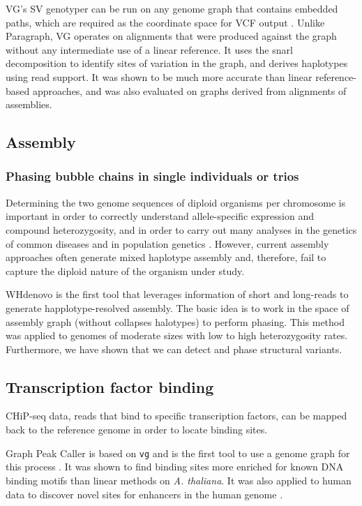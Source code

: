 VG's SV genotyper can be run on any genome graph that contains embedded paths, which are required as the coordinate space for VCF output \cite{hickey2019genotyping}.
Unlike Paragraph, VG operates on alignments that were produced against the graph without any intermediate use of a linear reference.
It uses the snarl decomposition \cite{paten2018superbubbles} to identify sites of variation in the graph, and derives haplotypes using read support.
It was shown to be much more accurate than linear reference-based approaches, and was also evaluated on graphs derived from alignments of assemblies.

\subsection{Assembly}

\subsubsection{Phasing bubble chains in single individuals or trios}

Determining the two genome sequences of diploid organisms per chromosome is important in order to correctly understand allele-specific expression and compound heterozygosity, and in order to carry out many analyses in the genetics of common diseases and in population genetics \cite{tewhey2011importance}. 
However, current assembly approaches often generate mixed haplotype assembly and, therefore, fail to capture the diploid nature of the organism under study. 

WHdenovo \cite{garg2019trio, garg2018graph} is the first tool that leverages information of short and long-reads to generate happlotype-resolved assembly. 
The basic idea is to work in the space of assembly graph (without collapses halotypes) to perform phasing. 
This method was applied to genomes of moderate sizes with low to high heterozygosity rates. 
Furthermore, we have shown that we can detect and phase structural variants.

\subsection{Transcription factor binding}

CHiP-seq data, reads that bind to specific transcription factors, can be mapped back to the reference genome in order to locate binding sites.
 
Graph Peak Caller is based on \texttt{vg} and is the first tool to use a genome graph for this process \cite{Grytten_2019}.
It was shown to find binding sites more enriched for known DNA binding motifs than linear methods on \emph{A.
thaliana}.
It was also applied to human data to discover novel sites for enhancers in the human genome \cite{groza2019personalized}. 

